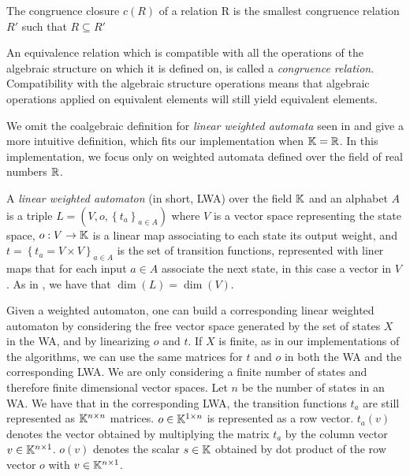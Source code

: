 \begin{defn}
  The congruence closure $c(R)$ of a relation R is the smallest congruence relation 
  $R'$ such that $R \subseteq R'$ 
\end{defn}

An equivalence relation which is compatible with all the operations of
the algebraic structure on which it is defined on, is called a 
\textit{congruence relation}. Compatibility with the algebraic structure operations
means that algebraic operations applied on equivalent elements will still
yield equivalent elements. 




We omit the coalgebraic definition for \textit{linear weighted automata} seen in 
\cite{BONCHI201277} and give a more intuitive definition, which fits our  
implementation when $\mathbb{K} = \mathbb{R}$.
In this implementation, we focus only on weighted automata defined over 
the field of real numbers $\mathbb{R}$. 

\begin{defn}
  A \textit{linear weighted automaton} (in short, LWA) over the field $\mathbb{K}$ and 
  an alphabet $A$
  is a triple  $L = (V, o, \left\lbrace t_a \right\rbrace_{a \in A})$ 
  where $V$ is a vector space representing the state space, 
  $o: V \to \mathbb{K}$ is a linear map associating to each state its output weight,
  and $t = \left\lbrace t_a = V \times V \right\rbrace_{a \in A}$ is
  the set of transition functions, represented with liner maps 
  that for each input $a \in A$ associate the next state, in this case a vector
  in $V$.
  As in \cite{boreale2009weighted}, we have that $\dim{(L)} = \dim{(V)}$.
\end{defn}

Given a weighted automaton, one can build a corresponding linear weighted automaton
by considering the free vector space generated by the set of states $X$ in the WA,
and by linearizing $o$ and $t$. If $X$ is finite, as in our implementations
of the algorithms, we can use the same matrices for 
$t$ and $o$ in both the WA and the corresponding LWA.
We are only considering a finite number of states and therefore finite dimensional
vector spaces. Let $n$ be the number of states in an WA.
We have that in the corresponding LWA, the transition functions $t_a$ are still
 represented as
$\mathbb{K}^{n \times n}$ matrices. $o \in \mathbb{K}^{1 \times n}$ is represented as a row vector.
$t_a(v)$ denotes the vector obtained by multiplying the matrix $t_a$ by the column 
vector $v  \in \mathbb{K}^{n \times 1}$. $o(v)$ denotes the scalar $s \in \mathbb{K}$ obtained by 
dot product of the row vector $o$ with $v \in \mathbb{K}^{n \times 1}$.

